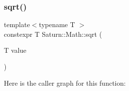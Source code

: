 \mbox{\label{namespace_saturn_1_1_math_aadd63a3c5022270cc7837d2583cb888d}} 
\subsubsection{\texorpdfstring{sqrt()}{sqrt()}}
{\footnotesize\ttfamily template$<$typename T $>$ \\
constexpr T Saturn\+::\+Math\+::sqrt (\begin{DoxyParamCaption}\item[{T}]{value }\end{DoxyParamCaption})}

Here is the caller graph for this function\+:
